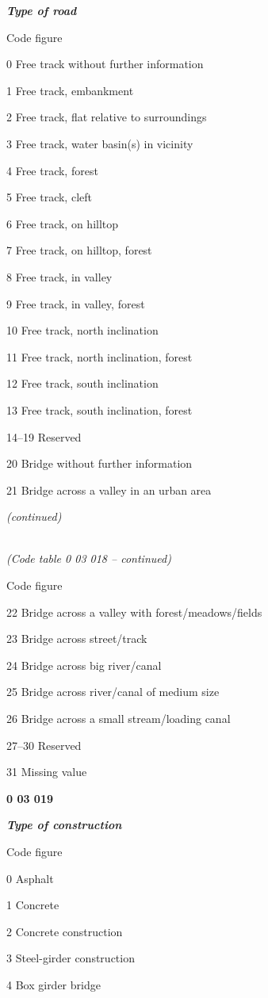 \emph{\textbf{Type of road}}

Code figure

0 Free track without further information

1 Free track, embankment

2 Free track, flat relative to surroundings

3 Free track, water basin(s) in vicinity

4 Free track, forest

5 Free track, cleft

6 Free track, on hilltop

7 Free track, on hilltop, forest

8 Free track, in valley

9 Free track, in valley, forest

10 Free track, north inclination

11 Free track, north inclination, forest

12 Free track, south inclination

13 Free track, south inclination, forest

14--19 Reserved

20 Bridge without further information

21 Bridge across a valley in an urban area

\emph{(continued)}

\emph{\\
(Code table 0 03 018 -- continued)}

Code figure

22 Bridge across a valley with forest/meadows/fields

23 Bridge across street/track

24 Bridge across big river/canal

25 Bridge across river/canal of medium size

26 Bridge across a small stream/loading canal

27--30 Reserved

31 Missing value

\textbf{0 03 019}

\emph{\textbf{Type of construction}}

Code figure

0 Asphalt

1 Concrete

2 Concrete construction

3 Steel-girder construction

4 Box girder bridge

